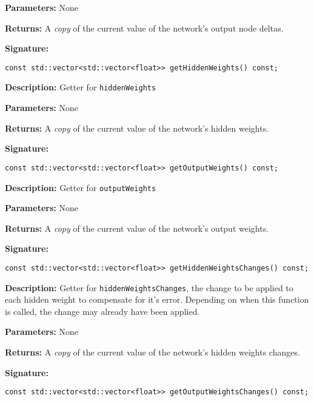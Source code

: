 \documentclass[a4paper]{article}
\begin{document}
\textbf{Parameters: } None

\textbf{Returns: }
A \textit{copy} of the current value of the network's output node deltas.

\hrulefill %

\textbf{Signature:} \begin{lstlisting}
const std::vector<std::vector<float>> getHiddenWeights() const;
\end{lstlisting}

\textbf{Description: }
Getter for \lstinline{hiddenWeights}

\textbf{Parameters: } None

\textbf{Returns: }
A \textit{copy} of the current value of the network's hidden weights.

\hrulefill %

\textbf{Signature:} \begin{lstlisting}
const std::vector<std::vector<float>> getOutputWeights() const;
\end{lstlisting}

\textbf{Description: }
Getter for \lstinline{outputWeights}

\textbf{Parameters: } None

\textbf{Returns: }
A \textit{copy} of the current value of the network's output weights.

\hrulefill %

\textbf{Signature:} \begin{lstlisting}
const std::vector<std::vector<float>> getHiddenWeightsChanges() const;
\end{lstlisting}

\textbf{Description: }
Getter for \lstinline{hiddenWeightsChanges}, the change to be applied to each hidden weight to compensate for it's error. Depending on when this function is called, the change may already have been applied.

\textbf{Parameters: } None

\textbf{Returns: }
A \textit{copy} of the current value of the network's hidden weights changes.

\hrulefill %

\textbf{Signature:} \begin{lstlisting}
const std::vector<std::vector<float>> getOutputWeightsChanges() const;
\end{lstlisting}
\end{document}
